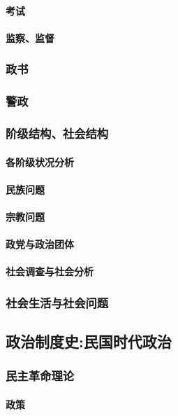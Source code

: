 \documentclass[UTF8]{../RepresentationUniverse}
\begin{document}
        \paragraph{考试}
        \paragraph{监察、监督}
    \subsubsection{政书}
    \subsubsection{警政}
    \subsubsection{阶级结构、社会结构}
        \paragraph{各阶级状况分析}
        \paragraph{民族问题}
        \paragraph{宗教问题}
        \paragraph{政党与政治团体}
        \paragraph{社会调查与社会分析}
    \subsubsection{社会生活与社会问题}


\subsection{政治制度史:民国时代政治}
    \subsubsection{民主革命理论}
        \paragraph{政策}
\end{document}
